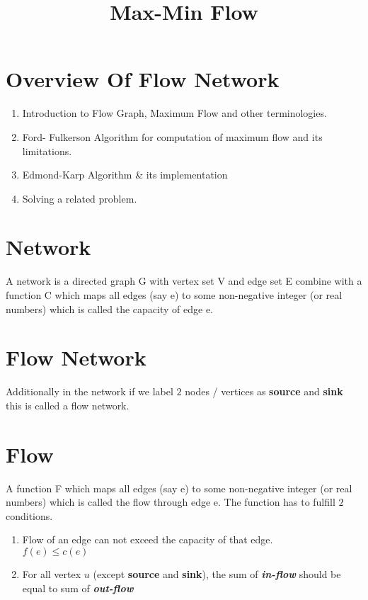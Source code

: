 \documentclass[border=4mm]{article}
\title{Max-Min Flow}
\begin{document}
    \maketitle
    \tableofcontents
    \section{Overview Of Flow Network}
    \begin{enumerate}
        \item Introduction to Flow Graph, Maximum Flow and other terminologies.
        \item Ford- Fulkerson Algorithm for computation of maximum flow and its limitations.
        \item Edmond-Karp Algorithm \& its implementation
        \item Solving a related problem.
    \end{enumerate}

    \section{Network}
        A network is a directed graph G with vertex set V and edge set E combine with a function C which maps all edges (say e) to some non-negative integer (or real numbers) which is called the capacity of edge e.

    \section{Flow Network}
        Additionally in the network if we label $2$ nodes / vertices as \textbf{source} and \textbf{sink} this is called a flow network.
    
    \section{Flow}
        A function F which maps all edges (say e) to some non-negative integer (or real numbers) which is called the flow through edge e.
        The function has to fulfill $2$ conditions.
        \begin{enumerate}
            \item Flow of an edge can not exceed the capacity of that edge. \\
            $f(e) \leq c(e)$
            \item For all vertex $u$ (except \textbf{source} and \textbf{sink}), the sum of \textbf{\emph{in-flow}} should be equal to sum of \textbf{\emph{out-flow}}
        \end{enumerate}
    
\end{document}
